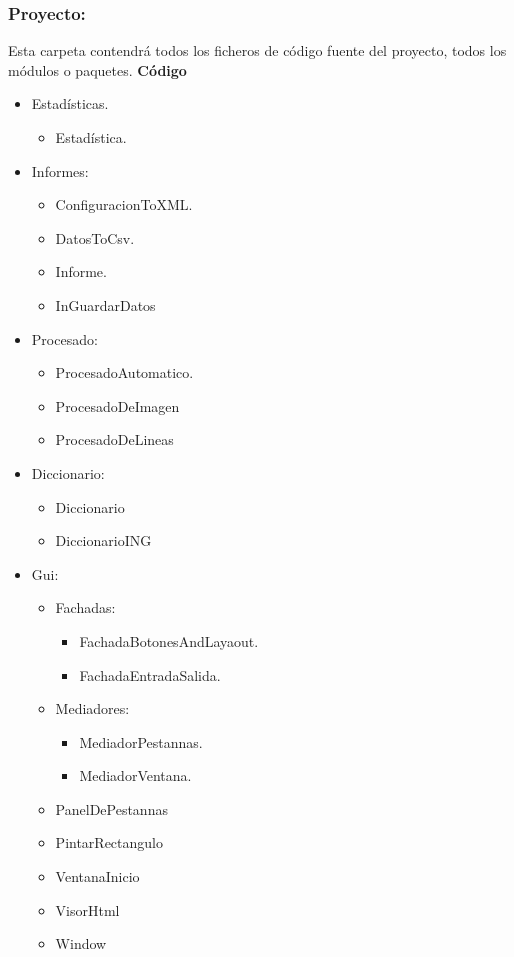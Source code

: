\subsubsection{Proyecto:}
Esta carpeta contendrá todos los ficheros de código fuente del proyecto, todos los módulos o paquetes.
\textbf{Código}
\begin{itemize}
	\item Estadísticas.
		\begin{itemize}
			\item Estadística.
		\end{itemize}
	\item Informes:
		\begin{itemize}
			\item ConfiguracionToXML.
			\item DatosToCsv.
			\item Informe.
			\item InGuardarDatos
		\end{itemize}
	\item Procesado:
		\begin{itemize}
			\item ProcesadoAutomatico.
			\item ProcesadoDeImagen
			\item ProcesadoDeLineas
		\end{itemize}
	\item Diccionario:
		\begin{itemize}
			\item Diccionario
			\item DiccionarioING
		\end{itemize}	
	\item Gui:
	

 
\begin{itemize}
		\item Fachadas:
			\begin{itemize}
				\item FachadaBotonesAndLayaout.
				\item FachadaEntradaSalida.
			\end{itemize}
		\item Mediadores:
			\begin{itemize}
				\item MediadorPestannas.
				\item MediadorVentana.
			\end{itemize}
		\item PanelDePestannas
		\item PintarRectangulo
		\item VentanaInicio
		\item VisorHtml
		\item Window
\end{itemize}
\end{itemize}	


